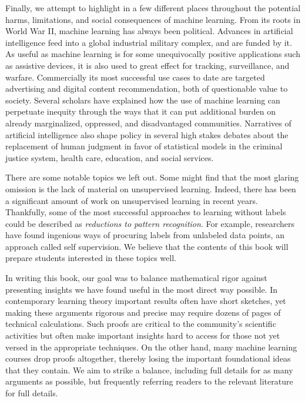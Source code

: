 \documentclass{tufte-book}
\begin{document}
Finally, we attempt to highlight in a few different places throughout
the potential harms, limitations, and social consequences of machine
learning. From its roots in World War II, machine learning has always
been political. Advances in artificial intelligence feed into a global
industrial military complex, and are funded by it. As useful as machine
learning is for some unequivocally positive applications such as
assistive devices, it is also used to great effect for tracking,
surveillance, and warfare. Commercially its most successful use cases to
date are targeted advertising and digital content recommendation, both
of questionable value to society. Several scholars have explained how
the use of machine learning can perpetuate inequity through the ways
that it can put additional burden on already marginalized, oppressed,
and disadvantaged communities. Narratives of artificial intelligence
also shape policy in several high stakes debates about the replacement
of human judgment in favor of statistical models in the criminal justice
system, health care, education, and social services.

There are some notable topics we left out. Some might find that the most
glaring omission is the lack of material on unsupervised learning.
Indeed, there has been a significant amount of work on unsupervised
learning in recent years. Thankfully, some of the most successful
approaches to learning without labels could be described as
\emph{reductions to pattern recognition}. For example, researchers have
found ingenious ways of procuring labels from unlabeled data points, an
approach called self supervision. We believe that the contents of this
book will prepare students interested in these topics well.

In writing this book, our goal was to balance mathematical rigor against
presenting insights we have found useful in the most direct way
possible. In contemporary learning theory important results often have
short sketches, yet making these arguments rigorous and precise may
require dozens of pages of technical calculations. Such proofs are
critical to the community's scientific activities but often make
important insights hard to access for those not yet versed in the
appropriate techniques. On the other hand, many machine learning courses
drop proofs altogether, thereby losing the important foundational ideas
that they contain. We aim to strike a balance, including full details
for as many arguments as possible, but frequently referring readers to
the relevant literature for full details.
\end{document}
